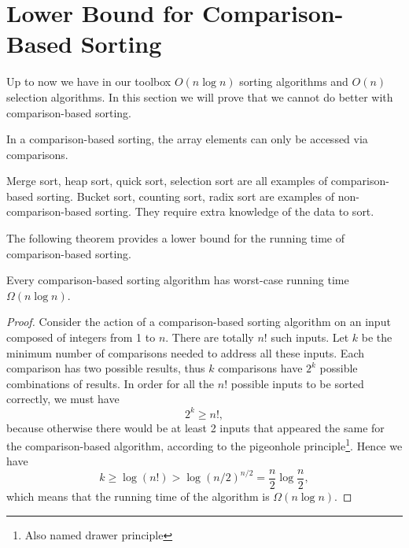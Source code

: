 \section{Lower Bound for Comparison-Based Sorting}
Up to now we have in our toolbox $O(n\log n)$ sorting algorithms and $O(n)$ selection algorithms. In this section we will prove that we cannot do better with comparison-based sorting.
\begin{definition}
In a comparison-based sorting, the array elements can only be accessed via comparisons. 
\end{definition}
Merge sort, heap sort, quick sort, selection sort are all examples of comparison-based sorting. Bucket sort, counting sort, radix sort are examples of non-comparison-based sorting. They require extra knowledge of the data to sort. 

The following theorem provides a lower bound for the running time of comparison-based sorting. 
\begin{theorem}
Every comparison-based sorting algorithm has worst-case running time $\Omega(n\log n)$.
\end{theorem}
\begin{proof}
Consider the action of a comparison-based sorting algorithm on an input composed of integers from 1 to $n$. There are totally $n!$ such inputs. Let $k$ be the minimum number of comparisons needed to address all these inputs. Each comparison has two possible results, thus $k$ comparisons have $2^k$ possible combinations of results. In order for all the $n!$ possible inputs to be sorted correctly, we must have
$$2^k\geq n!,$$
because otherwise there would be at least 2 inputs that appeared the same for the comparison-based algorithm, according to the pigeonhole principle\footnote{Also named drawer principle}. Hence we have 
$$k\geq\log(n!)>\log(n/2)^{n/2}=\frac{n}{2}\log\frac{n}{2},$$
which means that the running time of the algorithm is $\Omega(n\log n)$.


\end{proof}
\ifx\PREAMBLE\undefined

\fi